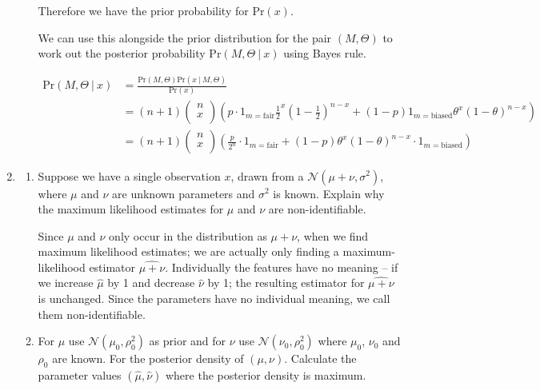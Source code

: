 \documentclass[10pt,\jkfside,a4paper]{article}
\begin{document}
\begin{enumerate}
\begin{enumerate}[label=(\alph*)]
Therefore we have the prior probability for $\text{Pr}(x)$.

We can use this alongside the prior distribution for the pair $(M, \Theta)$
to work out the posterior probability $\text{Pr}(M, \Theta \ | \ x)$ using
Bayes rule.

\[
\begin{split}
\text{Pr}(M, \Theta \ | \ x)
&= \frac{\text{Pr}(M, \Theta)\text{Pr}(x \ | \ M, \Theta)}{\text{Pr}(x)} \\
&= (n + 1)\begin{pmatrix}
n \\ x \\
\end{pmatrix}
\left( p\cdot 1_{m=\text{fair}}\frac{1}{2}^x\left(1 - \frac{1}{2}\right)^{n-x}
+ (1 - p)1_{m=\text{biased}}\theta^x\left( 1 - \theta \right)^{n-x}\right) \\
&= (n + 1)\begin{pmatrix}
n \\ x \\
\end{pmatrix}\left( \frac{p}{2^n}\cdot 1_{m=\text{fair}} + (1 - p)
\theta^x\left( 1 - \theta \right)^{n-x} \cdot 1_{m=\text{biased}} \right)
\end{split}
\]


\end{enumerate}

\item

\begin{enumerate}[label=(\alph*)]

\item Suppose we have a single observation $x$, drawn from a $\mathcal{N}
(\mu + \nu, \sigma^2)$, where $\mu$ and $\nu$ are unknown parameters and
$\sigma^2$ is known. Explain why the maximum likelihood estimates for $\mu$
and $\nu$ are non-identifiable.

Since $\mu$ and $\nu$ only occur in the distribution as $\mu + \nu$, when we
find maximum likelihood estimates; we are actually only finding a
maximum-likelihood estimator $\widehat{\mu + \nu}$. Individually the features
have no meaning -- if we increase $\hat{\mu}$ by 1 and decrease $\hat{\nu}$
by 1; the resulting estimator for $\widehat{\mu + \nu}$ is unchanged. Since
the parameters have no individual meaning, we call them non-identifiable.

\item For $\mu$ use $\mathcal{N}(\mu_0, \rho_0^2)$ as prior and for $\nu$
use $\mathcal{N}(\nu_0, \rho_0^2)$ where $\mu_0$, $\nu_0$ and $\rho_0$ are
known. For the posterior density of $(\mu, \nu)$. Calculate the parameter
values $(\hat{\mu}, \hat{\nu})$ where the posterior density is maximum.


\end{enumerate}
\end{enumerate}
\end{document}
